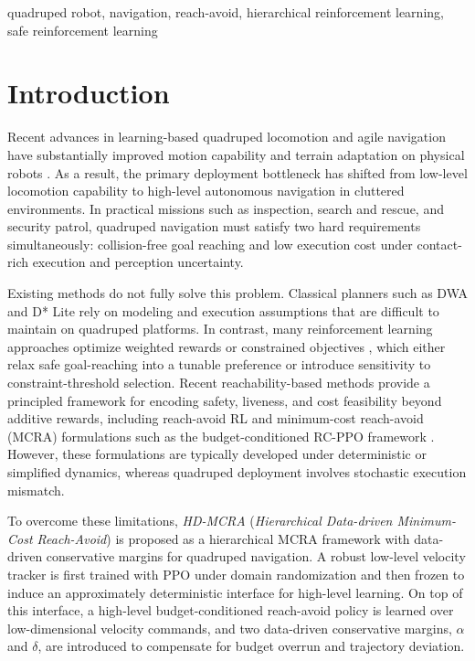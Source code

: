\documentclass[conference]{IEEEtran}
\begin{document}
\begin{IEEEkeywords}
quadruped robot, navigation, reach-avoid, hierarchical reinforcement learning, safe reinforcement learning
\end{IEEEkeywords}

\section{Introduction}
Recent advances in learning-based quadruped locomotion and agile navigation have substantially improved motion capability and terrain adaptation on physical robots \cite{DBLP:journals/scirobotics/HwangboWK020,DBLP:conf/rss/KumarFPM21,DBLP:journals/scirobotics/MikiLHWKH22,Hoeller2024}. As a result, the primary deployment bottleneck has shifted from low-level locomotion capability to high-level autonomous navigation in cluttered environments. In practical missions such as inspection, search and rescue, and security patrol, quadruped navigation must satisfy two hard requirements simultaneously: collision-free goal reaching and low execution cost under contact-rich execution and perception uncertainty.

Existing methods do not fully solve this problem. Classical planners such as DWA and D* Lite \cite{DBLP:journals/ram/FoxBT97,DBLP:conf/aaai/KoenigL02} rely on modeling and execution assumptions that are difficult to maintain on quadruped platforms. In contrast, many reinforcement learning approaches optimize weighted rewards or constrained objectives \cite{DBLP:conf/icml/AchiamHTA17,DBLP:conf/iclr/TesslerMM19,GuerrierFB24}, which either relax safe goal-reaching into a tunable preference or introduce sensitivity to constraint-threshold selection. Recent reachability-based methods provide a principled framework for encoding safety, liveness, and cost feasibility beyond additive rewards, including reach-avoid RL and minimum-cost reach-avoid (MCRA) formulations such as the budget-conditioned RC-PPO framework \cite{DBLP:conf/rss/HsuRTF21,DBLP:conf/nips/SoGF24,Ganai2024HJSurvey,GanaiGYHG23}. However, these formulations are typically developed under deterministic or simplified dynamics, whereas quadruped deployment involves stochastic execution mismatch.

To overcome these limitations, \emph{HD-MCRA} (\emph{Hierarchical Data-driven Minimum-Cost Reach-Avoid}) is proposed as a hierarchical MCRA framework with data-driven conservative margins for quadruped navigation. A robust low-level velocity tracker is first trained with PPO under domain randomization and then frozen to induce an approximately deterministic interface for high-level learning. On top of this interface, a high-level budget-conditioned reach-avoid policy is learned over low-dimensional velocity commands, and two data-driven conservative margins, $\alpha$ and $\delta$, are introduced to compensate for budget overrun and trajectory deviation. 
\end{document}
